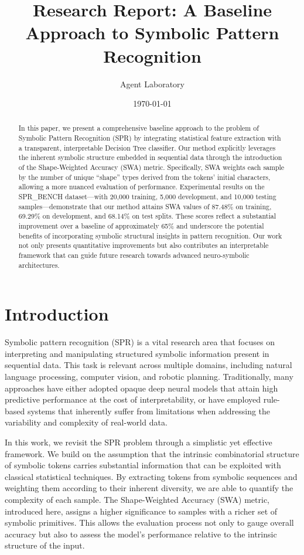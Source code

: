 \documentclass{article}
\title{Research Report: A Baseline Approach to Symbolic Pattern Recognition}
\author{Agent Laboratory}
\date{\today}
\begin{document}
\maketitle

\begin{abstract}
In this paper, we present a comprehensive baseline approach to the problem of Symbolic Pattern Recognition (SPR) by integrating statistical feature extraction with a transparent, interpretable Decision Tree classifier. Our method explicitly leverages the inherent symbolic structure embedded in sequential data through the introduction of the Shape-Weighted Accuracy (SWA) metric. Specifically, SWA weights each sample by the number of unique “shape” types derived from the tokens’ initial characters, allowing a more nuanced evaluation of performance. Experimental results on the SPR\_BENCH dataset—with 20,000 training, 5,000 development, and 10,000 testing samples—demonstrate that our method attains SWA values of 87.48\% on training, 69.29\% on development, and 68.14\% on test splits. These scores reflect a substantial improvement over a baseline of approximately 65\% and underscore the potential benefits of incorporating symbolic structural insights in pattern recognition. Our work not only presents quantitative improvements but also contributes an interpretable framework that can guide future research towards advanced neuro-symbolic architectures.

\end{abstract}

\section{Introduction}
Symbolic pattern recognition (SPR) is a vital research area that focuses on interpreting and manipulating structured symbolic information present in sequential data. This task is relevant across multiple domains, including natural language processing, computer vision, and robotic planning. Traditionally, many approaches have either adopted opaque deep neural models that attain high predictive performance at the cost of interpretability, or have employed rule-based systems that inherently suffer from limitations when addressing the variability and complexity of real-world data. 

In this work, we revisit the SPR problem through a simplistic yet effective framework. We build on the assumption that the intrinsic combinatorial structure of symbolic tokens carries substantial information that can be exploited with classical statistical techniques. By extracting tokens from symbolic sequences and weighting them according to their inherent diversity, we are able to quantify the complexity of each sample. The Shape-Weighted Accuracy (SWA) metric, introduced here, assigns a higher significance to samples with a richer set of symbolic primitives. This allows the evaluation process not only to gauge overall accuracy but also to assess the model’s performance relative to the intrinsic structure of the input.
\end{document}
